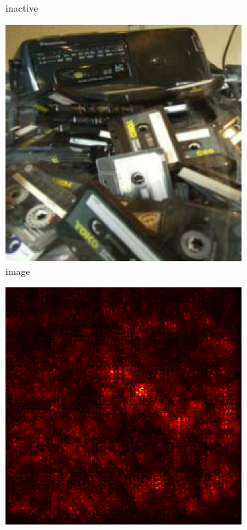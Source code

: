 \documentclass[preprint,12pt]{elsarticle}
\begin{document}
\begin{figure}
\begin{subfigure}{0.14\textwidth}
        \caption{inactive}
    \end{subfigure}
    \hfill
    \begin{subfigure}{0.14\linewidth}
        \centering
        \includegraphics[width=\linewidth]{../visualizations/examples/imagenette/resnet18/images/2.png}
        \caption{image}
    \end{subfigure}
    \hfill
    \begin{subfigure}{0.14\linewidth}
        \centering
        \includegraphics[width=\linewidth]{../visualizations/examples/imagenette/resnet18/saliency_map/2.png}

\end{subfigure}
\end{figure}
\end{document}
